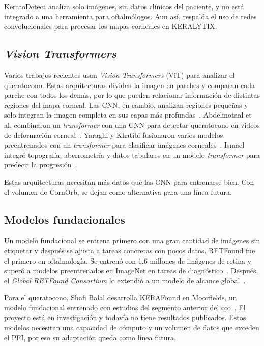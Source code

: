         KeratoDetect analiza solo imágenes, sin datos clínicos del paciente, y no está integrado a una herramienta para oftalmólogos. Aun así, respalda el uso de redes convolucionales para procesar los mapas corneales en KERALYTIX.

    \subsection*{\textit{Vision Transformers}}

        Varios trabajos recientes usan \textit{Vision Transformers} (ViT) para analizar el queratocono. Estas arquitecturas dividen la imagen en parches y comparan cada parche con todos los demás, por lo que pueden relacionar información de distintas regiones del mapa corneal. Las CNN, en cambio, analizan regiones pequeñas y solo integran la imagen completa en sus capas más profundas~\cite{vit_dosovitskiy, vit_raghu}. Abdelmotaal et al. combinaron un \textit{transformer} con una CNN para detectar queratocono en videos de deformación corneal~\cite{abdelmotaal_vit}. Yaraghi y Khatibi fusionaron varios modelos preentrenados con un \textit{transformer} para clasificar imágenes corneales~\cite{vit_fusion_kcn}. Ismael integró topografía, aberrometría y datos tabulares en un modelo \textit{transformer} para predecir la progresión~\cite{vit_multisource}.

        Estas arquitecturas necesitan más datos que las CNN para entrenarse bien. Con el volumen de CornOrb, se dejan como alternativa para una línea futura.

    \subsection*{Modelos fundacionales}

        Un modelo fundacional se entrena primero con una gran cantidad de imágenes sin etiquetar y después se ajusta a tareas concretas con pocos datos. RETFound fue el primero en oftalmología. Se entrenó con 1,6 millones de imágenes de retina y superó a modelos preentrenados en ImageNet en tareas de diagnóstico~\cite{retfound}. Después, el \textit{Global RETFound Consortium} lo extendió a un modelo de alcance global~\cite{retfound_global}.

        Para el queratocono, Shafi Balal desarrolla KERAFound en Moorfields, un modelo fundacional entrenado con estudios del segmento anterior del ojo~\cite{kerafound}. El proyecto está en investigación y todavía no tiene resultados publicados. Estos modelos necesitan una capacidad de cómputo y un volumen de datos que exceden el PFI, por eso su adaptación queda como línea futura.


